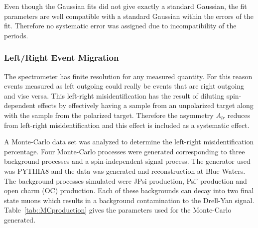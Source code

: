 Even though the Gaussian fits did not give exactly a standard Gaussian, the fit
parameters are well compatible with a standard Gaussian within the errors of the
fit.  Therefore no systematic error was assigned due to incompatibility of the
periods.

\subsubsection{Left/Right Event Migration} \label{sec::syslrEventMigration}
The spectrometer has finite resolution for any measured quantity.  For this
reason events measured as left outgoing could really be events that are right
outgoing and vise versa.  This left-right misidentification has the result of
diluting spin-dependent effects by effectively having a sample from an
unpolarized target along with the sample from the polarized target.  Therefore
the asymmetry $A_{lr}$ reduces from left-right misidentification and this
effect is included as a systematic effect. 

A Monte-Carlo data set was analyzed to determine the left-right
misidentification percentage.  Four Monte-Carlo processes were generated
corresponding to three background processes and a spin-independent signal
process.  The generator used was PYTHIA8 and the data was generated and
reconstruction at Blue Waters.  The background processes simulated were JPsi
production, Psi' production and open charm (OC) production.  Each of these
backgrounds can decay into two final state muons which results in a background
contamination to the Drell-Yan signal.  Table~\ref{tab::MCproduction} gives the
parameters used for the Monte-Carlo generated.

